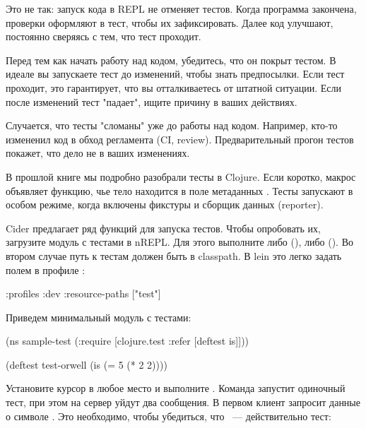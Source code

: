Это не так: запуск кода в REPL не отменяет тестов. Когда программа закончена, проверки оформляют в тест, чтобы их зафиксировать. Далее код улучшают, постоянно сверяясь с тем, что тест проходит.

Перед тем как начать работу над кодом, убедитесь, что он покрыт тестом. В идеале вы запускаете тест до изменений, чтобы знать предпосылки. Если тест проходит, это гарантирует, что вы отталкиваетесь от штатной ситуации. Если после изменений тест "падает", ищите причину в ваших действиях.

Случается, что тесты "сломаны" уже до работы над кодом. Например, кто-то измененил код в обход регламента (CI, review). Предварительный прогон тестов покажет, что дело не в ваших изменениях.

В прошлой книге мы подробно разобрали тесты в Clojure. Если коротко, макрос  объявляет функцию, чье тело находится в поле метаданных . Тесты запускают в особом режиме, когда включены фикстуры и сборщик данных (reporter).

Cider предлагает ряд функций для запуска тестов. Чтобы опробовать их, загрузите модуль с тестами в nREPL. Для этого выполните либо  (), либо  (). Во втором случае путь к тестам должен быть в classpath. В lein это легко задать полем  в профиле :

\begin{english}
  \begin{clojure}
{:profiles
 {:dev
  {:resource-paths ["test"]}}}
  \end{clojure}
\end{english}

Приведем минимальный модуль с тестами:

\begin{english}
  \begin{clojure}
(ns sample-test
  (:require
   [clojure.test :refer [deftest is]]))

(deftest test-orwell
  (is (= 5 (* 2 2))))
  \end{clojure}
\end{english}

Установите курсор в любое место  и выполните . Команда запустит одиночный тест, при этом на сервер уйдут два сообщения. В первом клиент запросит данные о символе . Это необходимо, чтобы убедиться, что ~--- действительно тест:

